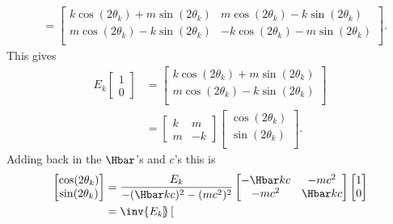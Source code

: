 {\begin{equation}
\begin{aligned}
\\ &=
\begin{bmatrix}
k \cos(2 \theta_k) + m \sin(2 \theta_k) & m \cos(2 \theta_k) - k \sin(2 \theta_k) \\
m \cos(2 \theta_k) - k \sin(2 \theta_k) & -k \cos(2 \theta_k) - m \sin(2 \theta_k) \\
\end{bmatrix}.
\end{aligned}
\end{equation}
%
This gives
%
\begin{equation}\label{eqn:qmLecture9Problems:320}
\begin{aligned}
E_k
\begin{bmatrix}
1 \\
0
\end{bmatrix}
&=
\begin{bmatrix}
k \cos(2 \theta_k) + m \sin(2 \theta_k) \\
m \cos(2 \theta_k) - k \sin(2 \theta_k) \\
\end{bmatrix}
\\ &=
\begin{bmatrix}
k & m \\
m & -k
\end{bmatrix}
\begin{bmatrix}
\cos(2 \theta_k) \\
\sin(2 \theta_k) \\
\end{bmatrix}.
\end{aligned}
\end{equation}
%
Adding back in the \(\Hbar\)'s and \(c\)'s this is
%
\begin{equation}\label{eqn:qmLecture9Problems:340}
\begin{aligned}
\begin{bmatrix}
\cos(2 \theta_k) \\
\sin(2 \theta_k) \\
\end{bmatrix}
&=
\frac{E_k}{-(\Hbar k c)^2 -(m c^2)^2}
\begin{bmatrix}
- \Hbar k c & - m c^2 \\
- m c^2     & \Hbar k c
\end{bmatrix}
\begin{bmatrix}
1 \\
0
\end{bmatrix}
\\ &=
\inv{E_k}
\begin{bmatrix}

\end{bmatrix}
\end{aligned}
\end{equation}}
